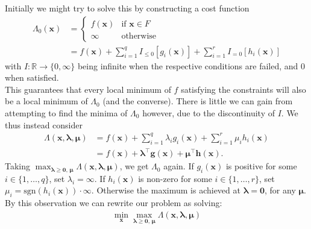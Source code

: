 \documentclass{tikzposter} %
\begin{document}
\begin{columns}
{  Initially we might try to solve this by constructing a cost function
  \begin{align*}
    \Lambda_{0} (\bm{x}) &= \begin{cases}
                    f(\bm{x}) & \text{if } \bm{x} \in F \\
                    \infty & \text{otherwise}
                  \end{cases} \\
    &= f(\bm{x}) + \sum_{i=1}^{q}I_{\le 0}[g_{i}(\bm{x})] + \sum_{i=1}^{r} I_{=0}[h_{i}(\bm{x})]
  \end{align*}
  with $I : \mathbb{R} \to \{0,\infty\}$ being infinite when the respective conditions are failed, and $0$ when satisfied. \\

  This guarantees that every local minimum of $f$ satisfying the constraints will also be a local minimum of $\Lambda_{0}$ (and the converse). There is little we can gain from attempting to find the minima of $\Lambda_{0}$ however, due to the discontinuity of $I$. We thus instead consider
  \begin{align*}
    \Lambda(\bm{x},\bm{\lambda},\bm{\mu}) &= f(\bm{x}) + \sum_{i=1}^{q} \lambda_{i} g_{i}(\bm{x}) + \sum_{i=1}^{r} \mu_{i} h_{i}(\bm{x}) \\
    &= f(\bm{x}) + \bm{\lambda}^{\top}\bm{g}(\bm{x}) + \bm{\mu}^{\top}\bm{h}(\bm{x}).
  \end{align*}
  Taking $\displaystyle\max_{\bm{\lambda} \ge \bm{0}, \,\bm{\mu}} \Lambda(\bm{x},\bm{\lambda},\bm{\mu})$, we get $\Lambda_{0}$ again. If $g_{i}(\bm{x})$ is positive for some $i \in \{1,\dots,q\}$, set $\lambda_{i} = \infty$. If $h_{i}(\bm{x})$ is non-zero for some $i \in \{1,\dots,r\}$, set $\mu_{i} = \mathrm{sgn}(h_{i}(\bm{x})) \cdot \infty$. Otherwise the maximum is achieved at $\bm{\lambda} = \bm{0}$, for any $\bm{\mu}$. \\

  By this observation we can rewrite our problem as solving:
  \begin{align}\label{primal:1}
  \min_{\bm{x}} \max_{\bm{\lambda} \ge \bm{0},\,\bm{\mu}} \Lambda(\bm{x},\bm{\lambda}, \bm{\mu})
  \end{align}
  }
\end{columns}
\end{document}
